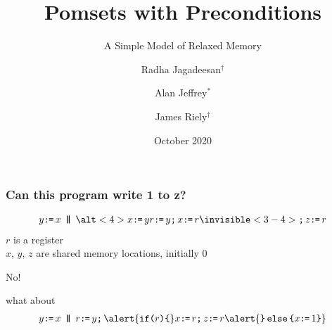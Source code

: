 \documentclass[t,aspectratio=169]{beamer} %
\title{Pomsets with Preconditions}
\subtitle{A Simple Model of Relaxed Memory}
\author{Radha Jagadeesan$^\dagger$ \and Alan Jeffrey$^*$ \and James Riely$^\dagger$}
\date{October 2020}
\institute{$^\dagger$DePaul University \and $^*$Mozilla Research and the Servo Project}
\begin{document}
\begin{frame}
  \maketitle
\end{frame}

\begin{frame}
  \frametitle{Can this program write 1 to z?}
  \begin{gather*}
    y\GETS x
    \PAR
    \alt<4>{x\GETS y}{r\GETS y \SEMI x\GETS r}
    \invisible<3-4>{\SEMI z\GETS r}
  \end{gather*}
  $r$ is a register\\
  $x$, $y$, $z$ are shared memory locations, initially $0$

  \bigskip \bigskip
  No!
  
  \bigskip \bigskip
  what about
  \begin{gather*}
    y\GETS x
    \PAR
    r\GETS y\SEMI
    \alert{\IF{r}\THEN} x\GETS r\SEMI z\GETS r \alert{\ELSE x\GETS1 \FI}
  \end{gather*}
\end{frame}
\end{document}

